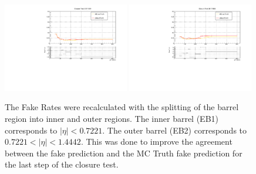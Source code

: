 \begin{figure}[!htbp]
  \centering
  \includegraphics[width=0.49\textwidth]{fig/closureTest_MCTruth_comparisonsEB1_2017_adjustrange.pdf}
  \includegraphics[width=0.49\textwidth]{fig/closureTest_MCTruth_comparisonsEB2_2017_adjustrange.pdf}
  \caption{The Fake Rates were recalculated with the splitting of the barrel region into inner and outer regions. The inner barrel (EB1) corresponds to $|\eta| <  0.7221$. The outer barrel (EB2) corresponds to $0.7221 < |\eta| < 1.4442$. This was done to improve the agreement between the fake prediction and the MC Truth fake prediction for the last step of the closure test.}
  \label{fig:templates_2017_etaBinnedEB}
\end{figure}

